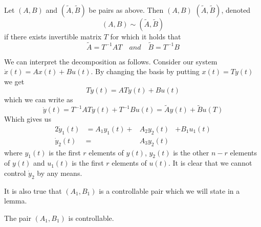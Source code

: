 \begin{definition}
	Let $(A,B)$ and $(\widetilde{A},\widetilde{B})$ be pairs as above. Then $(A,B)$  $(\widetilde{A},\widetilde{B})$, denoted $$(A,B) \sim (\widetilde{A},\widetilde{B})$$ if there exists invertible matrix $T$ for which it holds that $$\widetilde{A}=T^{-1}AT\quad and\quad\widetilde{B}=T^{-1}B$$
\end{definition}

We can interpret the decomposition as follows. Consider our system $\dot{x}(t)=Ax(t)+Bu(t)$. By changing the basis by putting $x(t)=Ty(t)$ we get $$T\dot{y}(t)=ATy(t)+Bu(t)$$ which we can write as $$\dot{y}(t)=T^{-1}ATy(t)+T^{-1}Bu(t)=\widetilde{A}y(t)+\widetilde{B}u(T)$$ Which gives us 
\begin{alignat*}{2}
	\dot{y}_1(t)&=A_1y_1(t)+&A_2y_2(t)&+B_1u_1(t) \\
	\dot{y}_2(t)&=&A_3y_2(t)&
\end{alignat*}
where $y_1(t)$ is the first $r$ elements of $y(t)$, $y_2(t)$ is the other $n-r$ elements of $y(t)$ and $u_1(t)$ is the first $r$ elements of $u(t)$. It is clear that we cannot control $\dot{y}_2$ by any means. 

It is also true that $(A_1,B_1)$ is a controllable pair which we will state in a lemma.

\begin{lemma}
	The pair $(A_1,B_1)$ is controllable.
\end{lemma}

